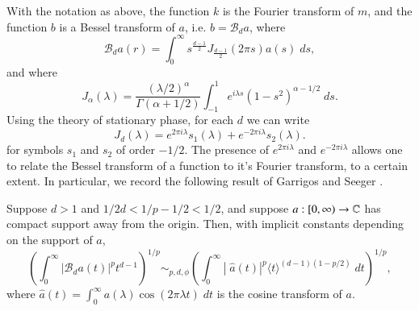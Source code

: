 With the notation as above, the function $k$ is the Fourier transform of $m$, and the function $b$ is a Bessel transform of $a$, i.e. $b = \mathcal{B}_d a$, where
%
\begin{equation}
  \mathcal{B}_d a(r) = \int_0^\infty s^{\frac{d-1}{2}} J_{\frac{d-1}{2}}(2 \pi s) a(s)\; ds,
\end{equation}
%
%
and where
%
\begin{equation}
  J_\alpha(\lambda) = \frac{(\lambda / 2)^\alpha}{\Gamma(\alpha + 1/2)} \int_{-1}^1 e^{i \lambda s} (1 - s^2)^{\alpha - 1/2}\; ds.
\end{equation}
%
Using the theory of stationary phase, for each $d$ we can write
%
\begin{equation}
  J_d(\lambda) = e^{2 \pi i \lambda} s_1(\lambda) + e^{-2 \pi i \lambda} s_2(\lambda).
\end{equation}
%
for symbols $s_1$ and $s_2$ of order $-1/2$. The presence of $e^{2 \pi i \lambda}$ and $e^{-2 \pi i \lambda}$ allows one to relate the Bessel transform of a function to it's Fourier transform, to a certain extent. In particular, we record the following result of Garrigos and Seeger \cite{GarrigosandSeeger}.

\begin{theorem} \label{GarrigosSeegerTheorem}
    Suppose $d > 1$ and $1/2d < 1/p - 1/2 < 1/2$, and suppose $a: [0,\infty) \to \operatorname{\mathbb{C}}$ has compact support away from the origin. Then, with implicit constants depending on the support of $a$,
    \[ \left( \int_0^\infty |\mathcal{B}_d a (t)|^p t^{d-1} \right)^{1/p} \sim_{p,d,\phi} \left( \int_0^\infty |\;\!\widehat{a}(t)|^p \langle t \rangle^{(d-1)(1 - p/2)}\; dt \right)^{1/p}, \]
    where $\widehat{a}(t) = \int_0^\infty a(\lambda) \cos(2 \pi \lambda t)\; dt$ is the cosine transform of $a$.
\end{theorem}

%
%
%
%

